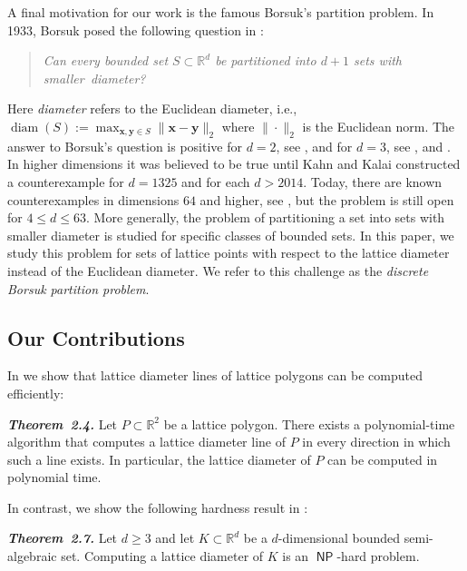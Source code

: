 \documentclass[11pt]{article}
\newcommand{\bu}{\mathbf{u}}
\newcommand{\bx}{\mathbf{x}}
\newcommand{\by}{\mathbf{y}}
\newcommand{\R}{\mathbb{R}}
\newcommand{\Z}{\mathbb{Z}}
\DeclareMathOperator{\diam}{diam}
\DeclareMathOperator{\NP}{\mathsf{NP}} %
\begin{document}
A final motivation for our work is the famous Borsuk's partition problem. In 1933, Borsuk posed the following question in \cite{borsuk1933drei}:
\begin{quote}
    \emph{Can every bounded set $S \subset \R^d$ be partitioned into $d+1$ sets with \mbox{smaller diameter?}}
\end{quote}
Here \textit{diameter} refers to the Euclidean diameter, i.e., $\diam(S) := \max_{\bx,\by \in S} \|\bx-\by\|_2$ where $\| \cdot \|_2$ is the Euclidean norm.
The answer to Borsuk's question is positive for $d=2$, see \cite{borsuk1933drei}, and for $d=3$, see \cite{perkal1947subdivision}, \cite{eggleston1955covering} and \cite{grunbaum1957simple}. In higher dimensions it was believed to be true until Kahn and Kalai \cite{kahn1993counterexample} constructed a counterexample for $d=1325$ and for each $d>2014$. Today, there are known counterexamples in dimensions $64$ and higher, see \cite{jenrich201464}, but the problem is still open for $4\leq d\leq 63$.
More generally, the problem of partitioning a set into sets with smaller diameter is studied for specific classes of bounded sets. In this paper, we study this problem for sets of lattice points with respect to the lattice diameter instead of the Euclidean diameter. We refer to this challenge as the \textit{discrete Borsuk partition problem}.

\subsection*{Our Contributions}

In  we show that lattice diameter lines of lattice polygons can be computed efficiently:

\begin{manualthm}\emph{\textbf{Theorem~2.4.}}
    Let $P \subset \R^2 $ be a lattice polygon. There exists a polynomial-time algorithm that computes a lattice diameter line of $P$ in every direction in which such a line exists. In particular, the lattice diameter of $P$ can be computed in polynomial time.
\end{manualthm} 

In contrast, we show the following hardness result in :

\begin{manualthm}\textbf{\emph{Theorem~2.7.}}
    Let $d \geq 3$ and let $K \subset \R^d$ be a $d$-dimensional bounded semi-algebraic set. \mbox{Computing} a lattice diameter of $K$ is an $\NP$-hard problem. 
\end{manualthm}
\end{document}
